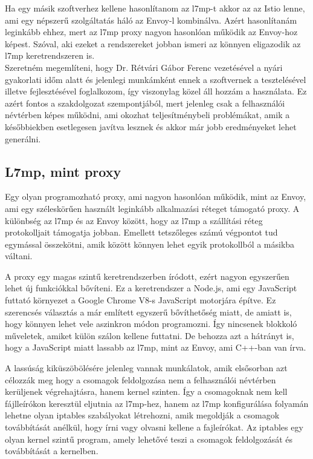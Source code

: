 Ha egy másik szoftverhez kellene hasonlítanom az l7mp-t akkor az az Istio 
lenne, ami egy népszerű szolgáltatás háló az Envoy-l kombinálva. Azért 
hasonlítanám leginkább ehhez, mert az l7mp proxy nagyon hasonlóan működik az
Envoy-hoz képest. Szóval, aki ezeket a rendszereket jobban ismeri az 
könnyen eligazodik az l7mp keretrendszeren is.\\

Szeretném megemlíteni, hogy Dr. Rétvári Gábor Ferenc vezetésével a nyári
gyakorlati időm alatt és jelenlegi munkámként ennek a szoftvernek a tesztelésével 
illetve fejlesztésével foglalkozom, így viszonylag közel áll hozzám a használata.
Ez azért fontos a szakdolgozat szempontjából, mert jelenleg csak a felhasználói névtérben
képes működni, ami okozhat teljesítménybeli problémákat, amik a későbbiekben 
esetlegesen javítva lesznek és akkor már jobb eredményeket lehet generálni. 

\subsection{L7mp, mint proxy}

Egy olyan programozható proxy, ami nagyon hasonlóan működik, mint az Envoy, ami 
egy széleskörűen használt leginkább alkalmazási réteget támogató proxy. A különbség
az l7mp és az Envoy között, hogy az l7mp a szállítási réteg protokolljait 
támogatja jobban. Emellett tetszőleges számú végpontot tud egymással összekötni, 
amik között könnyen lehet egyik protokollból a másikba váltani. 

A proxy egy magas szintű keretrendszerben íródott, ezért nagyon egyszerűen 
lehet új funkciókkal bővíteni. Ez a keretrendszer a Node.js, ami egy JavaScript
futtató környezet a Google Chrome V8-s JavaScript motorjára építve. Ez szerencsés 
választás a már említett egyszerű bővíthetőség miatt, de  amiatt is, hogy
könnyen lehet vele aszinkron módon programozni. Így nincsenek blokkoló műveletek,
amiket külön szálon kellene futtatni. De behozza azt a hátrányt is, hogy a 
JavaScript miatt lassabb az l7mp, mint az Envoy, ami C++-ban van írva. 

A lassúság kiküszöbölésére jelenleg vannak munkálatok, amik elsősorban azt 
célozzák meg hogy a csomagok feldolgozása nem a felhasználói névtérben kerüljenek
végrehajtásra, hanem kernel szinten. Így a csomagoknak nem kell fájlleírókon 
keresztül eljutnia az l7mp-hez, hanem az l7mp konfigurálása folyamán lehetne
olyan iptables szabályokat létrehozni, amik megoldják a csomagok továbbítását
anélkül, hogy írni vagy olvasni kellene a fajleírókat. Az iptables egy olyan 
kernel szintű program, amely lehetővé teszi a csomagok feldolgozását és továbbítását
a kernelben. \\

